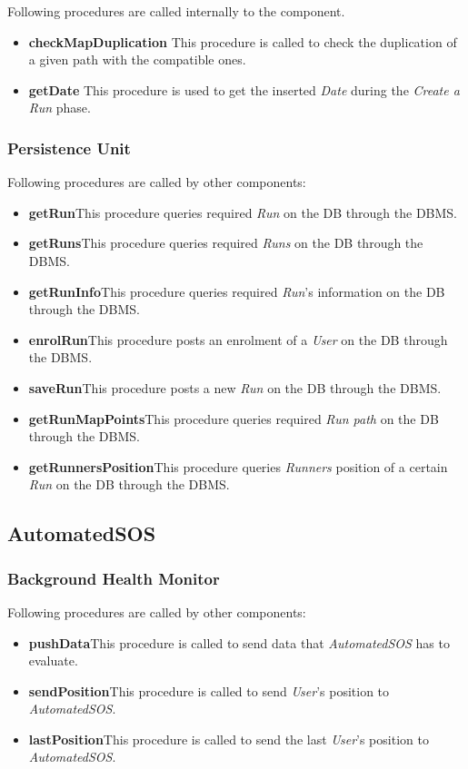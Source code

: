 \myparagraph{}
Following procedures are called internally to the component.
\begin{itemize}
  \item \textbf{checkMapDuplication} \quad This procedure is called to check the duplication of a given path with the compatible ones.
  \item \textbf{getDate} \quad This procedure is used to get the inserted \textit{Date} during the \textit{Create a Run} phase.
\end{itemize}

\subsubsection{Persistence Unit}
Following procedures are called by other components:
\begin{itemize}
  \item \textbf{getRun}\quad This procedure queries required \textit{Run} on the DB through the DBMS.
  \item \textbf{getRuns}\quad This procedure queries required \textit{Runs} on the DB through the DBMS.
  \item \textbf{getRunInfo}\quad This procedure queries required \textit{Run}'s information on the DB through the DBMS.
  \item \textbf{enrolRun}\quad This procedure posts an enrolment of a \textit{User} on the DB through the DBMS.
  \item \textbf{saveRun}\quad This procedure posts a new \textit{Run} on the DB through the DBMS.
  \item \textbf{getRunMapPoints}\quad This procedure queries required \textit{Run path} on the DB through the DBMS.
  \item \textbf{getRunnersPosition}\quad This procedure queries \textit{Runners} position of a certain \textit{Run }on the DB through the DBMS.
\end{itemize}

\subsection{AutomatedSOS}
\subsubsection{Background Health Monitor}
Following procedures are called by other components:
\begin{itemize}
  \item \textbf{pushData}\quad This procedure is called to send data that \textit{AutomatedSOS} has to evaluate.
  \item \textbf{sendPosition}\quad This procedure is called to send \textit{User}'s position to \textit{AutomatedSOS}.
  \item \textbf{lastPosition}\quad This procedure is called to send the last \textit{User}'s position to \textit{AutomatedSOS}.
\end{itemize}

